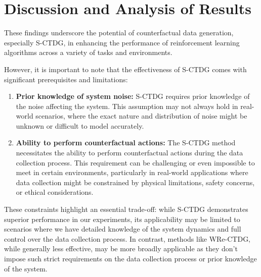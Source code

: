 \section{Discussion and Analysis of Results}

These findings underscore the potential of counterfactual data generation,
especially S-CTDG, in enhancing the performance of reinforcement learning
algorithms across a variety of tasks and environments.

However, it is important to note that the effectiveness of S-CTDG
comes with significant prerequisites and limitations:
\begin{enumerate}
    \item \textbf{Prior knowledge of system noise:} S-CTDG requires prior
    knowledge of the noise affecting the system.
    This assumption may not always hold in real-world scenarios,
    where the exact nature and distribution of noise might be
    unknown or difficult to model accurately.
    \item \textbf{Ability to perform counterfactual actions:} The S-CTDG
    method necessitates the ability to perform counterfactual actions during
    the data collection process. This requirement can be challenging or
    even impossible to meet in certain environments, particularly in
    real-world applications where data collection might be constrained
    by physical limitations, safety concerns, or ethical considerations.
\end{enumerate}
These constraints highlight an essential trade-off: while S-CTDG
demonstrates superior performance in our experiments,
its applicability may be limited to scenarios where we have
detailed knowledge of the system dynamics and full control over
the data collection process. In contrast, methods like WRe-CTDG,
while generally less effective, may be more broadly applicable as
they don't impose such strict requirements on the data collection
process or prior knowledge of the system.